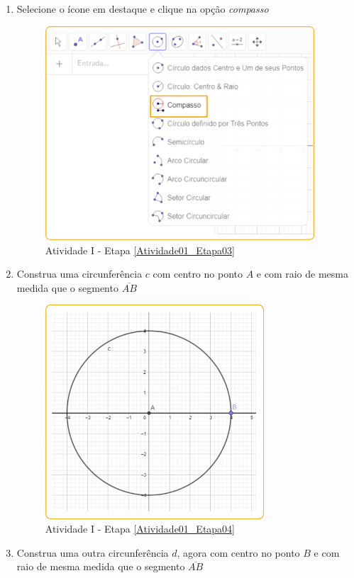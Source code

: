 \documentclass[11pt,a4paper]{article}
\begin{document}
\begin{enumerate}[{Etapa} 1.]
\item Selecione o ícone em destaque e clique na opção {\it compasso} \label{Atividade01_Etapa03}

\begin{figure}[H]
    \centering
    \includegraphics[height=8cm]{Figuras/T01_Elemento04.png}
    \caption{Atividade I - Etapa \ref{Atividade01_Etapa03}}
    \label{Atividade01_Etapa03_Imagem}
\end{figure}

\item Construa uma circunferência $c$ com centro no ponto $A$ e com raio de mesma medida que o segmento $\overline{AB}$ \label{Atividade01_Etapa04}

\begin{figure}[H]
    \centering
    \includegraphics[height=8cm]{Figuras/T01_Atividade01_Fig02.png}
    \caption{Atividade I - Etapa \ref{Atividade01_Etapa04}}
    \label{Atividade01_Etapa04_Imagem}
\end{figure}

\item Construa uma outra circunferência $d$, agora com centro no ponto $B$ e com raio de mesma medida que o segmento $\overline{AB}$ \label{Atividade01_Etapa05}


\end{enumerate}
\end{document}
